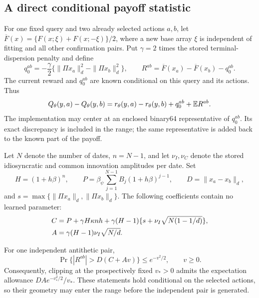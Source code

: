 \subsection{A direct conditional payoff statistic}
\label{app:r16menustatistic}

For one fixed query and two already selected actions $a,b$, let
$\overline F(x)=\{F(x;\xi)+F(x;-\xi)\}/2$, where a new base array
$\xi$ is independent of fitting and all other confirmation pairs. Put
$\gamma=2$ times the stored terminal-dispersion penalty and define
\[
 q_0^{ab}=-\frac\gamma2
       \{\|\Pi x_a\|_d^2-\|\Pi x_b\|_d^2\},\qquad
 R^{ab}=\overline F(x_a)-\overline F(x_b)-q_0^{ab}.
\]
The current reward and $q_0^{ab}$ are known conditional on this query
and its actions. Thus
\begin{equation}
 Q_\theta(y,a)-Q_\theta(y,b)
       =r_\theta(y,a)-r_\theta(y,b)+q_0^{ab}+\mathbb E R^{ab}.
 \label{eq:r16menucentered}
\end{equation}
The implementation may center at an enclosed binary64 representative of
$q_0^{ab}$. Its exact discrepancy is included in the range; the same
representative is added back to the known part of the payoff.

Let $N$ denote the number of dates, $n=N-1$, and let $\nu_I,\nu_C$
denote the stored idiosyncratic and common innovation amplitudes per
date. Set
\[
 H=(1+h\beta)^n,\qquad
 P=\beta_\psi\sum_{j=1}^{N-1}B_j(1+h\beta)^{j-1},\qquad
 D=\|x_a-x_b\|_d,
\]
and $s=\max\{\|\Pi x_a\|_d,\|\Pi x_b\|_d\}$. The following
coefficients contain no learned parameter:
\begin{align}
 C&=P+\gamma H\kappa nh
       +\gamma(H-1)\{s+\nu_I\sqrt{N(1-1/d)}\},\notag\\
 A&=\gamma(H-1)\nu_I\sqrt{N/d}.
 \label{eq:r16menuconstants}
\end{align}

\begin{proposition}
\label{prop:r16menurange}
For one independent antithetic pair,
\[
 \Pr\{|R^{ab}|>D(C+Av)\}\leq e^{-v^2/2},\qquad v\geq0.
\]
Consequently, clipping at the prospectively fixed $v_*>0$ admits
the expectation allowance $DAe^{-v_*^2/2}/v_*$. These statements
hold conditional on the selected actions, so their geometry may enter
the range before the independent pair is generated.
\end{proposition}

